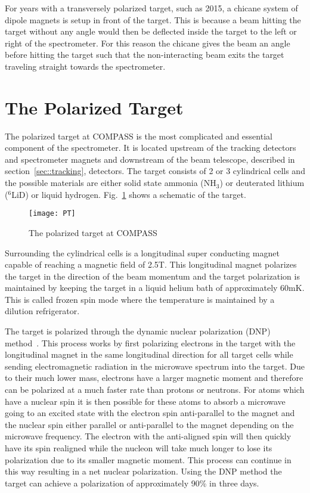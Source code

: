 For years with a transversely polarized target, such as 2015, a chicane system
of dipole magnets is setup in front of the target.  This is because a beam
hitting the target without any angle would then be deflected inside the target
to the left or right of the spectrometer.  For this reason the chicane gives the
beam an angle before hitting the target such that the non-interacting beam exits
the target traveling straight towards the spectrometer.


\section{The Polarized Target}
The polarized target at COMPASS is the most complicated and essential component
of the spectrometer.  It is located upstream of the tracking detectors and
spectrometer magnets and downstream of the beam telescope, described in
section~\ref{sec::tracking}, detectors.  The target consists of 2 or 3
cylindrical cells and the possible materials are either solid state ammonia
(NH$_3$) or deuterated lithium ($^6$LiD) or liquid hydrogen. Fig.~\ref{fig::PT}
shows a schematic of the target.  \par

\begin{figure}[h!t]
  \centering
  \texttt{[image: PT]}
  \caption{The polarized target at COMPASS}
  \label{fig::PT}
\end{figure}

Surrounding the cylindrical cells is a longitudinal super conducting magnet
capable of reaching a magnetic field of 2.5T.  This longitudinal magnet
polarizes the target in the direction of the beam momentum and the target
polarization is maintained by keeping the target in a liquid helium bath of
approximately 60mK.  This is called frozen spin mode where the temperature is
maintained by a dilution refrigerator. \par

The target is polarized through the dynamic nuclear polarization (DNP)
method~\cite{DNPmethod}.  This process works by first polarizing electrons in
the target with the longitudinal magnet in the same longitudinal direction for
all target cells while sending electromagnetic radiation in the microwave
spectrum into the target.  Due to their much lower mass, electrons have a larger
magnetic moment and therefore can be polarized at a much faster rate than
protons or neutrons.  For atoms which have a nuclear spin it is then possible
for these atoms to absorb a microwave going to an excited state with the
electron spin anti-parallel to the magnet and the nuclear spin either parallel
or anti-parallel to the magnet depending on the microwave frequency.  The
electron with the anti-aligned spin will then quickly have its spin realigned
while the nucleon will take much longer to lose its polarization due to its
smaller magnetic moment.  This process can continue in this way resulting in a
net nuclear polarization.  Using the DNP method the target can achieve a
polarization of approximately 90\% in three days. \par

